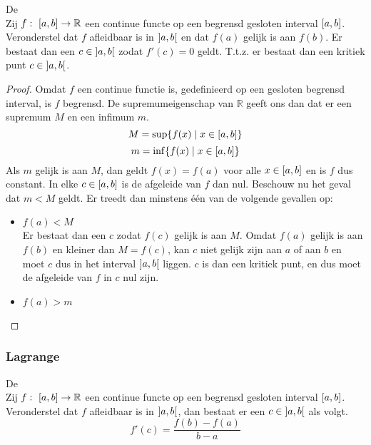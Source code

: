 \documentclass[main.tex]{subfiles}
\begin{document}
\begin{st}
  De \\
  Zij $f:\ \interval{a}{b} \rightarrow \mathbb{R}$ een continue functe op een begrensd gesloten interval $\interval{a}{b}$.
  Veronderstel dat $f$ afleidbaar is in $\interval[open]{a}{b}$ en dat $f(a)$ gelijk is aan $f(b)$.
  Er bestaat dan een $c\in \interval[open]{a}{b}$ zodat $f'(c)=0$ geldt.
  T.t.z. er bestaat dan een kritiek punt $c\in \interval[open]{a}{b}$.

  \begin{proof}
    Omdat $f$ een continue functie is, gedefinieerd op een gesloten begrensd interval, is $f$ begrensd.\needed
    De supremumeigenschap van $\mathbb{R}$ geeft ons dan dat er een supremum $M$ en een infimum $m$.
    \[ M = \sup\{f(x) \mid x \in \interval{a}{b} \} \]
    \[ m = \inf\{f(x) \mid x \in \interval{a}{b} \} \]
    Als $m$ gelijk is aan $M$, dan geldt $f(x)=f(a)$ voor alle $x \in \interval{a}{b}$ en is $f$ dus constant.
    In elke $c \in \interval{a}{b}$ is de afgeleide van $f$ dan nul.
    Beschouw nu het geval dat $m< M$ geldt.
    Er treedt dan minstens \'e\'en van de volgende gevallen op:
    \begin{itemize}
    \item $f(a) < M$\\
      Er bestaat dan een $c$ zodat $f(c)$ gelijk is aan $M$.\needed
      Omdat $f(a)$ gelijk is aan $f(b)$ en kleiner dan $M=f(c)$, kan $c$ niet gelijk zijn aan $a$ of aan $b$ en moet $c$ dus in het interval $\interval[open]{a}{b}$ liggen.
      $c$ is dan een kritiek punt, en dus moet de afgeleide van $f$ in $c$ nul zijn.\needed
    \item $f(a) > m$\\
    \end{itemize}
  \end{proof}
\end{st}

\subsubsection{Lagrange}
\label{sec:lagrange}

\begin{st}
  De \\
  Zij $f:\ \interval{a}{b} \rightarrow \mathbb{R}$ een continue functe op een begrensd gesloten interval $\interval{a}{b}$.
  Veronderstel dat $f$ afleidbaar is in $\interval[open]{a}{b}$, dan bestaat er een $c\in \interval[open]{a}{b}$ als volgt.
  \[ f'(c) = \frac{f(b)-f(a)}{b-a} \]
\end{st}
\end{document}
